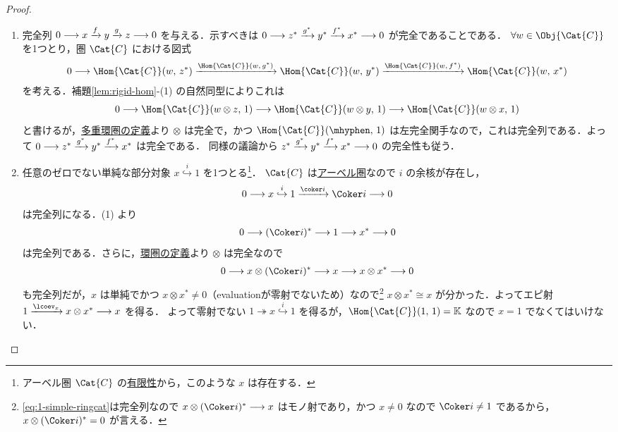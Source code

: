 \documentclass[TQFT_main]{subfiles}
\begin{document}
\begin{proof}
    \begin{enumerate}
        \item 完全列 $0 \longrightarrow x \xrightarrow{f} y \xrightarrow{g} z \longrightarrow 0$ を与える．示すべきは $0 \longrightarrow z^* \xrightarrow{g^*} y^* \xrightarrow{f^*} x^* \longrightarrow 0$ が完全であることである．
        $\forall w \in \Obj{\Cat{C}}$ を1つとり，圏 $\Cat{C}$ における図式
        \begin{align}
            0 \lto \Hom{\Cat{C}}(w,\, z^*) \xrightarrow{\Hom{\Cat{C}}(w,\, g^*)} \Hom{\Cat{C}}(w,\, y^*) \xrightarrow{\Hom{\Cat{C}}(w,\, f^*)} \Hom{\Cat{C}}(w,\, x^*)
        \end{align}
        を考える．補題\ref{lem:rigid-hom}-(1) の自然同型によりこれは
        \begin{align}
            0 \lto \Hom{\Cat{C}}(w \otimes z,\, 1) \lto \Hom{\Cat{C}}(w \otimes y,\, 1) \lto \Hom{\Cat{C}}(w \otimes x,\, 1)
        \end{align}
        と書けるが，\hyperref[def:ringcat]{多重環圏の定義}より $\otimes$ は完全で，かつ $\Hom{\Cat{C}}(\mhyphen,\, 1)$ は左完全関手なので，これは完全列である．よって $0 \longrightarrow z^* \xrightarrow{g^*} y^* \xrightarrow{f^*} x^*$ は完全である．
        同様の議論から $z^* \xrightarrow{g^*} y^* \xrightarrow{f^*} x^* \longrightarrow 0$ の完全性も従う．

        \item 任意のゼロでない単純な部分対象 $x \overset{i}{\hookrightarrow} 1$ を1つとる\footnote{アーベル圏 $\Cat{C}$ の\hyperref[def:finite-abcat]{有限性}から，このような $x$ は存在する．}．
        $\Cat{C}$ は\hyperref[def:additive-cat]{アーベル圏}なので $i$ の余核が存在し，
        \begin{align}
            0 \lto x \overset{i}{\hookrightarrow} 1 \xrightarrow{\coker i} \Coker i \lto 0
        \end{align}
        は完全列になる．(1) より
        \begin{align}
            0 \lto (\Coker i)^* \lto 1 \lto x^* \lto 0
        \end{align}
        は完全列である．さらに，\hyperref[def:ringcat]{環圏の定義}より $\otimes$ は完全なので
        \begin{align}
            \label{eq:1-simple-ringcat}
            0 \lto x \otimes (\Coker i)^* \lto x \lto x \otimes x^* \lto 0
        \end{align}
        も完全列だが，$x$ は単純でかつ $x \otimes x^* \neq 0$（evaluationが零射でないため）なので\footnote{\eqref{eq:1-simple-ringcat}は完全列なので $x \otimes (\Coker i)^* \lto x$ はモノ射であり，かつ $x \neq 0$ なので $\Coker i \neq 1$ であるから，$x \otimes (\Coker i)^* = 0$ が言える．} $x \otimes x^* \cong x$ が分かった．よってエピ射 $1 \xrightarrow{\lcoev_x} x \otimes x^* \lto x$ を得る．
        よって零射でない $1 \twoheadrightarrow x \overset{i}{\hookrightarrow} 1$ を得るが，$\Hom{\Cat{C}}(1,\, 1) = \mathbb{K}$ なので $x = 1$ でなくてはいけない．
    \end{enumerate}
\end{proof}
\end{document}
